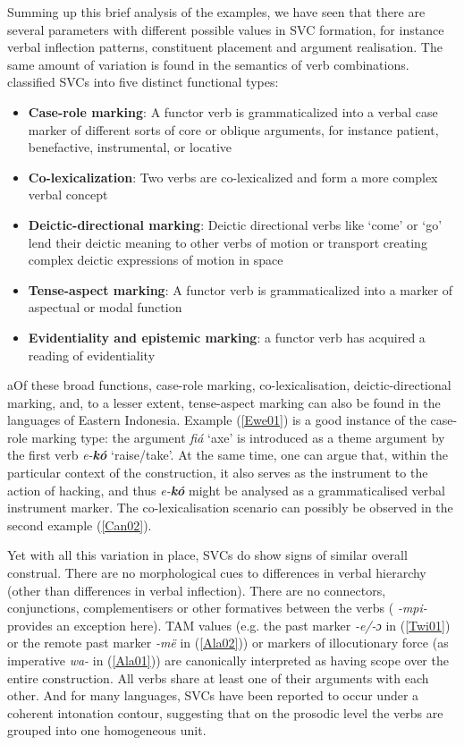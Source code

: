 Summing up this brief analysis of the examples, we have seen that there are several parameters with different possible values in SVC formation, for instance verbal inflection patterns, constituent placement and argument realisation. The same amount of variation is found in the semantics of verb combinations. \citet{givon1991serial} classified SVCs into five distinct functional types:

\begin{footnotesize}
\begin{itemize}
\item \textbf{Case-role marking}: A functor verb is grammaticalized into a verbal case marker of different sorts of core or oblique arguments, for instance patient, benefactive, instrumental, or locative
\item \textbf{Co-lexicalization}: Two verbs are co-lexicalized and form a more complex verbal concept
\item \textbf{Deictic-directional marking}: Deictic directional verbs like `come' or `go' lend their deictic meaning to other verbs of motion or transport creating complex deictic expressions of motion in space
\item \textbf{Tense-aspect marking}: A functor verb is grammaticalized into a marker of aspectual or modal function
\item \textbf{Evidentiality and epistemic marking}: a functor verb has acquired a reading of evidentiality
\end{itemize}
\end{footnotesize}

aOf these broad functions, case-role marking, co-lexicalisation, deictic-direc\-tion\-al marking, and, to a lesser extent, tense-aspect marking can also be found in the languages of Eastern Indonesia. Example (\ref{Ewe01}) is a good instance of the case-role marking type: the argument \textit{fiá} `axe' is introduced as a theme argument by the first verb \textit{e-\textbf{kó}} `raise/take'. At the same time, one can argue that, within the particular context of the construction, it also serves as the instrument to the action of hacking, and thus \textit{e-\textbf{kó}} might be analysed as a grammaticalised verbal instrument marker. The co-lexicalisation scenario can possibly be observed in the second  example (\ref{Can02}).

Yet with all this variation in place, SVCs do show signs of similar overall construal. There are no morphological cues to differences in verbal hierarchy (other than differences in verbal inflection). There are no connectors, conjunctions, complementisers or other formatives between the verbs ( \textit{-mpi-} provides an exception here). TAM values (e.g. the past marker \textit{-e/-ɔ} in (\ref{Twi01}) or the remote past marker \textit{-më} in (\ref{Ala02})) or markers of illocutionary force (as imperative \textit{wa-} in (\ref{Ala01})) are canonically interpreted as having scope over the entire construction. All verbs share at least one of their arguments with each other. And for many languages, SVCs have been reported to occur under a coherent intonation contour, suggesting that on the prosodic level the verbs are grouped into one homogeneous unit.


